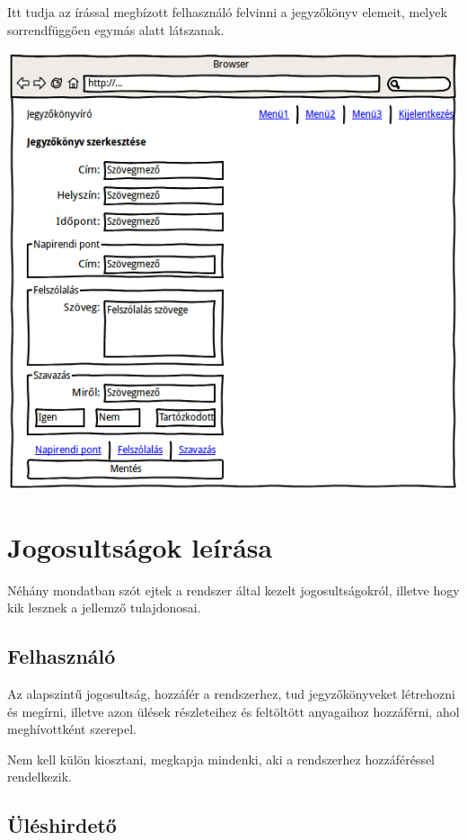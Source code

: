 \documentclass[a4paper,12pt,oneside]{report}
\begin{document}
Itt tudja az írással megbízott felhasználó felvinni a jegyzőkönyv elemeit, melyek sorrendfüggően egymás alatt látszanak.

\includegraphics[width=\textwidth]{wireframe-jegyzokonyvszerkesztes}

\section{Jogosultságok leírása}

Néhány mondatban szót ejtek a rendszer által kezelt jogosultságokról, illetve hogy kik lesznek a jellemző tulajdonosai.

\subsection*{Felhasználó}

Az alapszintű jogosultság, hozzáfér a rendszerhez, tud jegyzőkönyveket létrehozni és megírni, illetve azon ülések részleteihez és feltöltött anyagaihoz hozzáférni, ahol meghívottként szerepel.

Nem kell külön kiosztani, megkapja mindenki, aki a rendszerhez hozzáféréssel rendelkezik.

\subsection*{Üléshirdető}
\end{document}
